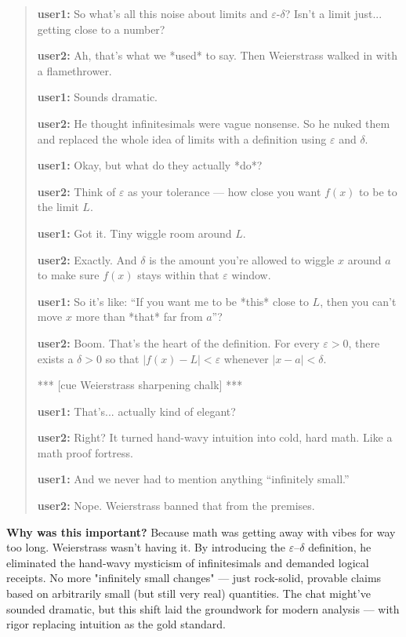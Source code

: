 \begin{quote}
{\ttfamily
\textbf{user1:} So what's all this noise about limits and $\varepsilon$-$\delta$? Isn’t a limit just... getting close to a number?

\textbf{user2:} Ah, that’s what we *used* to say. Then Weierstrass walked in with a flamethrower.

\textbf{user1:} Sounds dramatic.

\textbf{user2:} He thought infinitesimals were vague nonsense. So he nuked them and replaced the whole idea of limits with a definition using $\varepsilon$ and $\delta$.

\textbf{user1:} Okay, but what do they actually *do*?

\textbf{user2:} Think of $\varepsilon$ as your tolerance — how close you want $f(x)$ to be to the limit $L$.

\textbf{user1:} Got it. Tiny wiggle room around $L$.

\textbf{user2:} Exactly. And $\delta$ is the amount you're allowed to wiggle $x$ around $a$ to make sure $f(x)$ stays within that $\varepsilon$ window.

\textbf{user1:} So it's like: “If you want me to be *this* close to $L$, then you can’t move $x$ more than *that* far from $a$”?

\textbf{user2:} Boom. That’s the heart of the definition. For every $\varepsilon > 0$, there exists a $\delta > 0$ so that $|f(x) - L| < \varepsilon$ whenever $|x - a| < \delta$.

*** [cue Weierstrass sharpening chalk] ***

\textbf{user1:} That’s... actually kind of elegant?

\textbf{user2:} Right? It turned hand-wavy intuition into cold, hard math. Like a math proof fortress.

\textbf{user1:} And we never had to mention anything “infinitely small.”

\textbf{user2:} Nope. Weierstrass banned that from the premises. 
}
\end{quote}


\textbf{Why was this important?} Because math was getting away with vibes for way too long. Weierstrass wasn’t having it. By introducing the $\varepsilon$–$\delta$ definition, he eliminated the hand-wavy mysticism of infinitesimals and demanded logical receipts. No more "infinitely small changes" — just rock-solid, provable claims based on arbitrarily small (but still very real) quantities. The chat might’ve sounded dramatic, but this shift laid the groundwork for modern analysis — with rigor replacing intuition as the gold standard.


